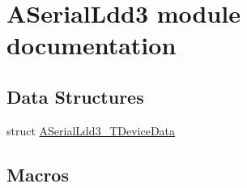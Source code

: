 \hypertarget{group___a_serial_ldd3__module}{}\section{A\+Serial\+Ldd3 module documentation}
\label{group___a_serial_ldd3__module}
\subsection*{Data Structures}
\begin{DoxyCompactItemize}
\item 
struct \hyperlink{struct_a_serial_ldd3___t_device_data}{A\+Serial\+Ldd3\+\_\+\+T\+Device\+Data}
\end{DoxyCompactItemize}
\subsection*{Macros}
